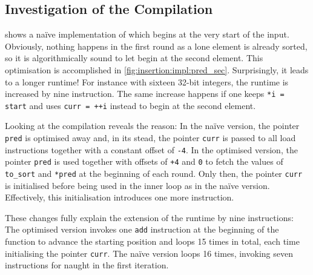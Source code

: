 \subsection{Investigation of the Compilation}
\label{sec:tasklet:insertion:compilation}

 shows a naïve implementation of \IS{} which begins at the very start of the input.
Obviously, nothing happens in the first round as a lone element is already sorted, so it is algorithmically sound to let \IS{} begin at the second element.
This optimisation is accomplished in \cref{fig:insertion:impl:pred_sec}.
Surprisingly, it leads to a longer runtime!
For instance with sixteen 32-bit integers, the runtime is increased by nine instruction.
The same increase happens if one keeps \lstinline|*i = start| and uses \lstinline|curr = ++i| instead to begin at the second element.

Looking at the compilation reveals the reason:
In the naïve version, the pointer \lstinline|pred| is optimised away and, in its stead, the pointer \lstinline|curr| is passed to all load instructions together with a constant offset of \lstinline|-4|.
In the optimised version, the pointer \lstinline|pred| is used together with offsets of \lstinline|+4| and \lstinline|0| to fetch the values of \lstinline|to_sort| and \lstinline|*pred| at the beginning of each round.
Only then, the pointer \lstinline|curr| is initialised before being used in the inner loop as in the naïve version.
Effectively, this initialisation introduces one more instruction.

These changes fully explain the extension of the runtime by nine instructions:
The optimised version invokes one \lstinline|add| instruction at the beginning of the function to advance the starting position and loops 15 times in total, each time initialising the pointer \lstinline|curr|.
The naïve version loops 16 times, invoking seven instructions for naught in the first iteration.

